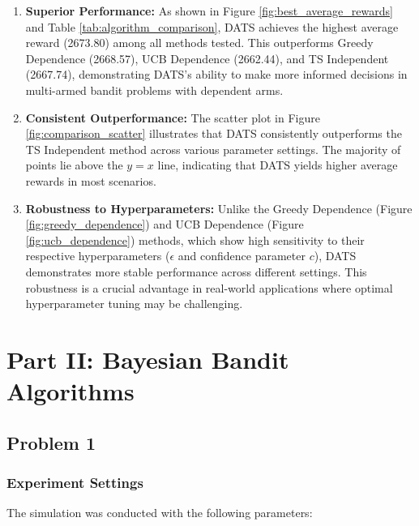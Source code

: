 \documentclass[11pt]{article}
\begin{document}
\begin{enumerate}
    \item \textbf{Superior Performance:} As shown in Figure \ref{fig:best_average_rewards} and Table \ref{tab:algorithm_comparison}, DATS achieves the highest average reward (2673.80) among all methods tested. This outperforms Greedy Dependence (2668.57), UCB Dependence (2662.44), and TS Independent (2667.74), demonstrating DATS's ability to make more informed decisions in multi-armed bandit problems with dependent arms.

    \item \textbf{Consistent Outperformance:} The scatter plot in Figure \ref{fig:comparison_scatter} illustrates that DATS consistently outperforms the TS Independent method across various parameter settings. The majority of points lie above the $y=x$ line, indicating that DATS yields higher average rewards in most scenarios.

    \item \textbf{Robustness to Hyperparameters:} Unlike the Greedy Dependence (Figure \ref{fig:greedy_dependence}) and UCB Dependence (Figure \ref{fig:ucb_dependence}) methods, which show high sensitivity to their respective hyperparameters ($\epsilon$ and confidence parameter $c$), DATS demonstrates more stable performance across different settings. This robustness is a crucial advantage in real-world applications where optimal hyperparameter tuning may be challenging.
\end{enumerate}

\newpage
\section{Part II: Bayesian Bandit Algorithms}
\subsection{Problem 1}
\subsubsection*{Experiment Settings}

The simulation was conducted with the following parameters:
\end{document}
